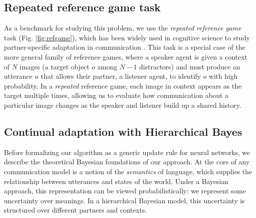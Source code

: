 \subsection{Repeated reference game task}
As a benchmark for studying this problem, we use the \emph{repeated reference game} task (Fig. \ref{fig:refgame}), which has been widely used in cognitive science to study partner-specific adaptation in communication \cite{KraussWeinheimer64_ReferencePhrases,ClarkWilkesGibbs86_ReferringCollaborative,WilkesGibbsClark92_CoordinatingBeliefs}.
This task is a special case of the more general family of reference games, where a speaker agent is given a context of $N$ images (a target object $o$ among $N-1$ distractors) and must produce an utterance $u$ that allows their partner, a listener agent, to identify $o$ with high probability. 
In a \emph{repeated} reference game, each image in context appears as the target multiple times, allowing us to evaluate how communication about a particular image changes as the speaker and listener build up a shared history. 

\subsection{Continual adaptation with Hierarchical Bayes}
Before formalizing our algorithm as a generic update rule for neural networks, we describe the theoretical Bayesian foundations of our approach.
At the core of any communication model is a notion of the \emph{semantics} of language, which supplies the relationship between utterances and states of the world. 
Under a Bayesian approach, this representation can be viewed probabilistically: we represent some uncertainty over meanings.
In a hierarchical Bayesian model, this uncertainty is structured over different partners and contexts.

